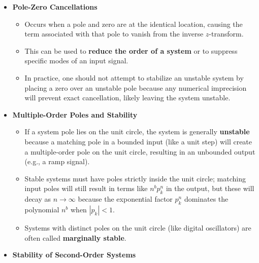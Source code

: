 \begin{itemize}
  \begin{itemize}
  \tightlist
  \item
    \textbf{Causality}: An LTI system is causal if and only if the
    region of convergence (ROC) of its system function is the
    \textbf{exterior of a circle}, including \(z = \infty\).
  \item
    \textbf{Stability}: An LTI system is BIBO stable if and only if the
    \textbf{unit circle (\(|z| = 1\)) is contained within the ROC} of
    the system function \(H(z)\).
  \item
    \textbf{Combined Requirement}: A causal LTI system is BIBO stable if
    and only if \textbf{all poles of \(H(z)\) lie strictly inside the
    unit circle}.
  \end{itemize}
\item
  \textbf{Pole-Zero Cancellations}

  \begin{itemize}
  \tightlist
  \item
    Occurs when a pole and zero are at the identical location, causing
    the term associated with that pole to vanish from the inverse
    \(z\)-transform.
  \item
    This can be used to \textbf{reduce the order of a system} or to
    suppress specific modes of an input signal.
  \item
    In practice, one should not attempt to stabilize an unstable system
    by placing a zero over an unstable pole because any numerical
    imprecision will prevent exact cancellation, likely leaving the
    system unstable.
  \end{itemize}
\item
  \textbf{Multiple-Order Poles and Stability}

  \begin{itemize}
  \tightlist
  \item
    If a system pole lies on the unit circle, the system is generally
    \textbf{unstable} because a matching pole in a bounded input (like a
    unit step) will create a multiple-order pole on the unit circle,
    resulting in an unbounded output (e.g., a ramp signal).
  \item
    Stable systems must have poles strictly inside the unit circle;
    matching input poles will still result in terms like \(n^{b} p_k^n\)
    in the output, but these will decay as \(n \to \infty\) because the
    exponential factor \(p_k^n\) dominates the polynomial \(n^b\) when
    \(|p_k| < 1\).
  \item
    Systems with distinct poles on the unit circle (like digital
    oscillators) are often called \textbf{marginally stable}.
  \end{itemize}
\item
  \textbf{Stability of Second-Order Systems}


\end{itemize}
